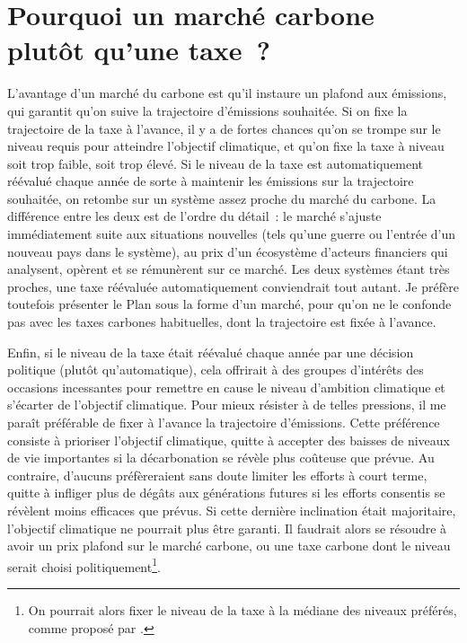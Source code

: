 \documentclass[a5paper,french,openany]{memoir}
\begin{document}

\section*{\normalsize Pourquoi un marché carbone plutôt qu'une taxe~?}\label{q:taxe}

L'avantage d'un marché du carbone est qu'il instaure un plafond aux émissions, qui garantit qu'on suive la trajectoire d'émissions souhaitée. Si on fixe la trajectoire de la taxe à l'avance, il y a de fortes chances qu'on se trompe sur le niveau requis pour atteindre l'objectif climatique, et qu'on fixe la taxe à niveau soit trop faible, soit trop élevé. Si le niveau de la taxe est automatiquement réévalué chaque année de sorte à maintenir les émissions sur la trajectoire souhaitée, on retombe sur un système assez proche du marché du carbone. La différence entre les deux est de l'ordre du détail~: le marché s'ajuste immédiatement suite aux situations nouvelles (tels qu'une guerre ou l'entrée d'un nouveau pays dans le système), au prix d'un écosystème d'acteurs financiers qui analysent, opèrent et se rémunèrent sur ce marché. Les deux systèmes étant très proches, une taxe réévaluée automatiquement conviendrait tout autant. Je préfère toutefois présenter le Plan sous la forme d'un marché, pour qu'on ne le confonde pas avec les taxes carbones habituelles, dont la trajectoire est fixée à l'avance. 

Enfin, si le niveau de la taxe était réévalué chaque année par une décision politique (plutôt qu'automatique), cela offrirait à des groupes d'intérêts des occasions incessantes pour remettre en cause le niveau d'ambition climatique et s'écarter de l'objectif climatique. Pour mieux résister à de telles pressions, il me paraît préférable de fixer à l'avance la trajectoire d'émissions. Cette préférence consiste à prioriser l'objectif climatique, quitte à accepter des baisses de niveaux de vie importantes si la décarbonation se révèle plus coûteuse que prévue. 
Au contraire, d'aucuns préfèreraient sans doute limiter les efforts à court terme, quitte à infliger plus de dégâts aux générations futures si les efforts consentis se révèlent moins efficaces que prévus. Si cette dernière inclination était majoritaire, l'objectif climatique ne pourrait plus être garanti. Il faudrait alors se résoudre à avoir un prix plafond sur le marché carbone, ou une taxe carbone dont le niveau serait choisi politiquement\footnote{On pourrait alors fixer le niveau de la taxe à la médiane des niveaux préférés, comme proposé par \cite{weitzman_world_2017}.}. 
\end{document}
